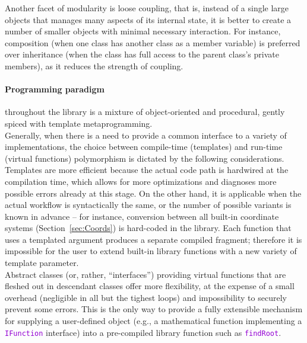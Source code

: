 \documentclass[12pt]{article}
\newcommand{\ttt}[1]{\textcolor{darkviolet}{\texttt{#1}}}
\begin{document}
Another facet of modularity is loose coupling, that is, instead of a single large objects that manages many aspects of its internal state, it is better to create a number of smaller objects with minimal necessary interaction. For instance, composition (when one class has another class as a member variable) is preferred over inheritance (when the class has full access to the parent class's private members), as it reduces the strength of coupling.

\paragraph{Programming paradigm} throughout the library is a mixture of object-oriented and procedural, gently spiced with template metaprogramming.\\
Generally, when there is a need to provide a common interface to a variety of implementations, the choice between compile-time (templates) and run-time (virtual functions) polymorphism is dictated by the following considerations.\\
Templates are more efficient because the actual code path is hardwired at the compilation time, which allows for more optimizations and diagnoses more possible errors already at this stage. On the other hand, it is applicable when the actual workflow is syntactically the same, or the number of possible variants is known in advance -- for instance, conversion between all built-in coordinate systems (Section~\ref{sec:Coords}) is hard-coded in the library. Each function that uses a templated argument produces a separate compiled fragment; therefore it is impossible for the user to extend built-in library functions with a new variety of template parameter.\\
Abstract classes (or, rather, ``interfaces'') providing virtual functions that are fleshed out in descendant classes offer more flexibility, at the expense of a small overhead (negligible in all but the tighest loops) and impossibility to securely prevent some errors. This is the only way to provide a fully extensible mechanism for supplying a user-defined object (e.g., a mathematical function implementing a \ttt{IFunction} interface) into a pre-compiled library function such as \ttt{findRoot}.
\end{document}
